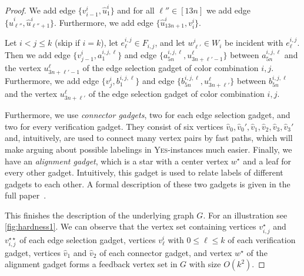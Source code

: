 \documentclass[a4paper,UKenglish,cleveref, autoref, thm-restate]{lipics-v2021}
\begin{document}
\begin{proof}
    We add edge $\{v^i_{i-1},\hat{u}^i_1\}$ and for all $\ell''\in[13n]$ we add edge $\{\hat{u}^i_{\ell''},\hat{u}^i_{\ell''+1}\}$. Furthermore, we add edge $\{\hat{u}^i_{13n+1},v^i_i\}$. 

    Let $i<j\le k$ (skip if $i=k$), let $e_\ell^{i,j}\in F_{i,j}$, and let $w^i_{\ell'}\in W_i$ be incident with $e_\ell^{i,j}$. Then we add edge $\{v_{j-1}^i,a^{i,j,\ell}_{1}\}$ and edge $\{a^{i,j,\ell}_{5n},u^\ell_{3n+\ell'-1}\}$ between $a^{i,j,\ell}_{5n}$ and the vertex $u^\ell_{3n+\ell'-1}$ of the edge selection gadget of color combination $i,j$.
    Furthermore, we add edge $\{v_{j}^i,b^{i,j,\ell}_{1}\}$ and edge $\{b^{i,j,\ell}_{5n},u^\ell_{3n+\ell'}\}$ between $b^{i,j,\ell}_{5n}$ and the vertex $u^\ell_{3n+\ell'}$ of the edge selection gadget of color combination $i,j$.




Furthermore, we use \emph{connector gadgets}, two for each edge selection gadget, and two for every verification gadget. They consist of six vertices $\hat{v}_0,\hat{v}_0',\hat{v}_1,\hat{v}_2,\hat{v}_3,\hat{v}_3'$ and, intuitively, are used to connect many vertex pairs by fast paths, which will make arguing about possible labelings in \textsc{Yes}-instances much easier. Finally, we have an \emph{alignment gadget}, which is a star with a center vertex $w^\star$ and a leaf for every other gadget. Intuitively, this gadget is used to relate labels of different gadgets to each other. A formal description of these two gadgets is given in the full paper~\cite{fullPaper}.

This finishes the description of the underlying graph $G$. For an illustration see \cref{fig:hardness1}. We can observe that the vertex set containing
    vertices $v_{i,j}^\star$ and $v_{i,j}^{\star\star}$ of each edge selection gadget,
    vertices $v^i_\ell$ with $0\le \ell\le k$ of each verification gadget,
    vertices $\hat{v}_1$ and $\hat{v}_2$ of each connector gadget, and
    vertex $w^\star$ of the alignment gadget
forms a feedback vertex set in $G$ with size $O(k^2)$.


\end{proof}
\end{document}
